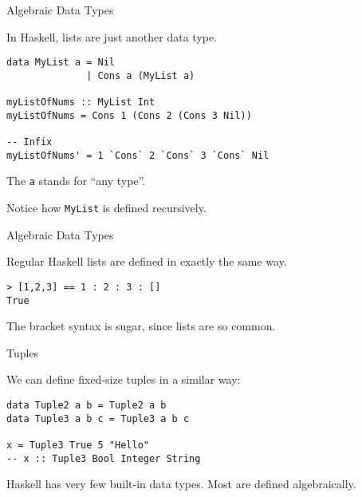 %
\begin{frame}[fragile]{Algebraic Data Types}

In Haskell, lists are just another data type.

\begin{block}{}
\begin{verbatim}
data MyList a = Nil
              | Cons a (MyList a)

myListOfNums :: MyList Int
myListOfNums = Cons 1 (Cons 2 (Cons 3 Nil))

-- Infix
myListOfNums' = 1 `Cons` 2 `Cons` 3 `Cons` Nil
\end{verbatim}
\end{block}

The \texttt{a} stands for ``any type''.

Notice how \texttt{MyList} is defined recursively.

\end{frame}

%
\begin{frame}[fragile]{Algebraic Data Types}

Regular Haskell lists are defined in exactly the same way.

\begin{block}{}
\begin{verbatim}
> [1,2,3] == 1 : 2 : 3 : []
True
\end{verbatim}
\end{block}

The bracket syntax is sugar, since lists are so common.

\end{frame}

%
\begin{frame}[fragile]{Tuples}

We can define fixed-size tuples in a similar way:

\begin{block}{}
\begin{verbatim}
data Tuple2 a b = Tuple2 a b
data Tuple3 a b c = Tuple3 a b c

x = Tuple3 True 5 "Hello"
-- x :: Tuple3 Bool Integer String
\end{verbatim}
\end{block}

Haskell has very few built-in data types. Most are defined algebraically.

\end{frame}
